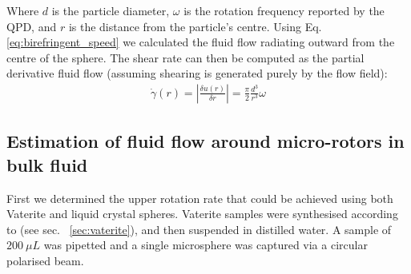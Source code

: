 Where $d$ is the particle diameter, $\omega$ is the rotation frequency
reported by the QPD, and $r$ is the distance from the particle's centre. 
Using Eq.\ref{eq:birefringent_speed} we calculated the fluid flow radiating
outward from the centre of the sphere. The shear rate can then be computed
as the partial derivative fluid flow (assuming shearing is generated purely
by the flow field):
\begin{align}
	\label{eq:birefringent_shear}
	\dot{\gamma}(r)=\left|\frac{\delta u(r)}{\delta r} \right|= \frac{\pi}{2}\frac{d^3}{r^3}\omega
\end{align}
\subsection{Estimation of fluid flow around micro-rotors in bulk fluid}
First we determined the upper rotation rate that could be achieved 
using both Vaterite and liquid crystal spheres. Vaterite samples were 
synthesised according to \cite{Parkin2009, Bishop2004} (see sec.~
\ref{sec:vaterite}), and then suspended in distilled water. A sample
of $200\ \mu L$ was pipetted and a single microsphere was captured via
a circular polarised beam. 

